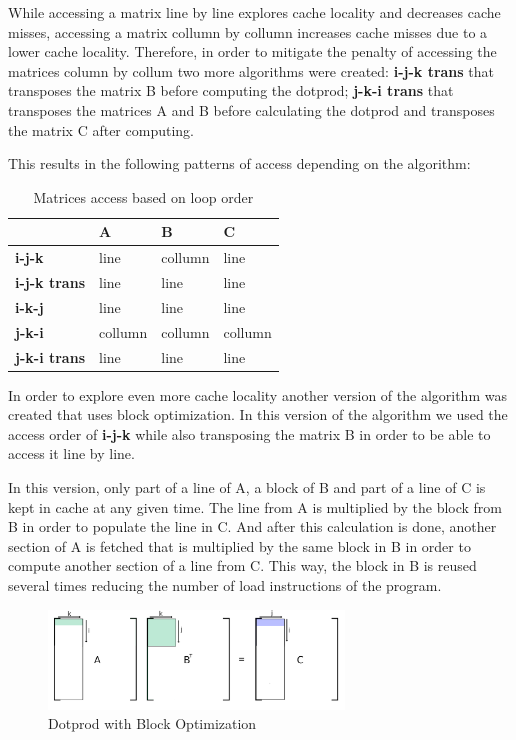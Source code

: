 \documentclass[a4paper]{report}
\begin{document}
While accessing a matrix line by line explores cache locality and decreases
cache misses, accessing a matrix collumn by collumn increases cache misses due
to a lower cache locality. Therefore, in order to mitigate the penalty of
accessing the matrices column by collum two more algorithms were created:
\textbf{i-j-k trans} that transposes the matrix B before computing the
dotprod; \textbf{j-k-i trans} that transposes the matrices A and B before
calculating the dotprod and transposes the matrix C after computing.

This results in the following patterns of access depending on the algorithm:

\begin{table}[H]
\centering
\begin{tabular}{|l|l|l|l|}
\hline
                     & A       & B       & C       \\ \hline
\textbf{i-j-k}       & line    & collumn & line    \\ \hline
\textbf{i-j-k trans} & line    & line    & line    \\ \hline
\textbf{i-k-j}       & line    & line    & line    \\ \hline
\textbf{j-k-i}       & collumn & collumn & collumn \\ \hline
\textbf{j-k-i trans} & line    & line    & line    \\ \hline
\end{tabular}
\caption{Matrices access based on loop order}
\end{table}

In order to explore even more cache locality another version of the algorithm
was created that uses block optimization. In this version of the algorithm we
used the access order of \textbf{i-j-k} while also transposing the matrix B in
order to be able to access it line by line.

In this version, only part of a line of A, a block of B and part of a line of C
is kept in cache at any given time. The line from A is multiplied by the block
from B in order to populate the line in C. And after this calculation is done,
another section of A is fetched that is multiplied by the same block in B
in order to compute another section of a line from C. This way, the block in B
is reused several times reducing the number of load instructions of the program.

\begin{figure}[H]
    \centering
        \includegraphics[width=0.7\textwidth]{images/matrix_mult_block.png}
        \caption{Dotprod with Block Optimization}
\end{figure}
\end{document}
